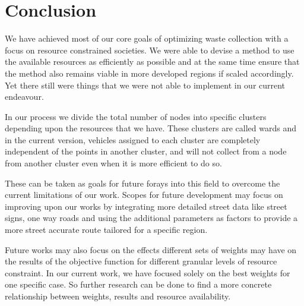 \documentclass[12pt]{article}
\begin{document}
\section{Conclusion}
We have achieved most of our core goals of optimizing waste collection with a focus on resource constrained societies. We were able to devise a method to use the available resources as efficiently as possible and at the same time ensure that the method also remains viable in more developed regions if scaled accordingly. Yet there still were things that we were not able to implement in our current endeavour. 

In our process we divide the total number of nodes into specific clusters depending upon the resources that we have. These clusters are called wards and in the current version, vehicles assigned to each cluster are completely independent of the points in another cluster, and will not collect from a node from another cluster even when it is more efficient to do so. 

These can be taken as goals for future forays into this field to overcome the current limitations of our work. Scopes for future development may focus on improving upon our works by integrating more detailed street data like street signs, one way roads and using the additional parameters as factors to provide a more street accurate route tailored for a specific region.

Future works may also focus on the effects different sets of weights may have on the results of the objective function for different granular levels of resource constraint. In our current work, we have focused solely on the best weights for one specific case. So further research can be done to find a more concrete relationship between weights, results and resource availability.  
\end{document}
